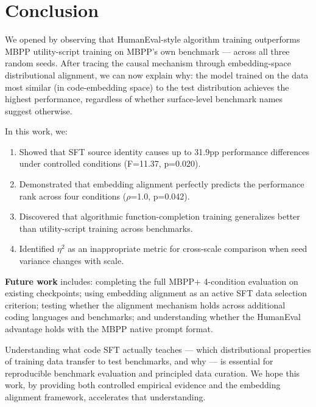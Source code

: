 \section{Conclusion}
\label{sec:conclusion}

We opened by observing that HumanEval-style algorithm training outperforms MBPP utility-script
training on MBPP's own benchmark --- across all three random seeds. After tracing the causal
mechanism through embedding-space distributional alignment, we can now explain why: the model
trained on the data most similar (in code-embedding space) to the test distribution achieves
the highest performance, regardless of whether surface-level benchmark names suggest otherwise.

In this work, we:
\begin{enumerate}
\item Showed that SFT source identity causes up to 31.9pp performance differences under controlled conditions (F=11.37, p=0.020).
\item Demonstrated that embedding alignment perfectly predicts the performance rank across four conditions ($\rho$=1.0, p=0.042).
\item Discovered that algorithmic function-completion training generalizes better than utility-script training across benchmarks.
\item Identified $\eta^2$ as an inappropriate metric for cross-scale comparison when seed variance changes with scale.
\end{enumerate}

\textbf{Future work} includes: completing the full MBPP+ 4-condition evaluation on existing checkpoints;
using embedding alignment as an active SFT data selection criterion; testing whether the alignment
mechanism holds across additional coding languages and benchmarks; and understanding whether the
HumanEval advantage holds with the MBPP native prompt format.

Understanding what code SFT actually teaches --- which distributional properties of training data
transfer to test benchmarks, and why --- is essential for reproducible benchmark evaluation and
principled data curation. We hope this work, by providing both controlled empirical evidence and
the embedding alignment framework, accelerates that understanding.
